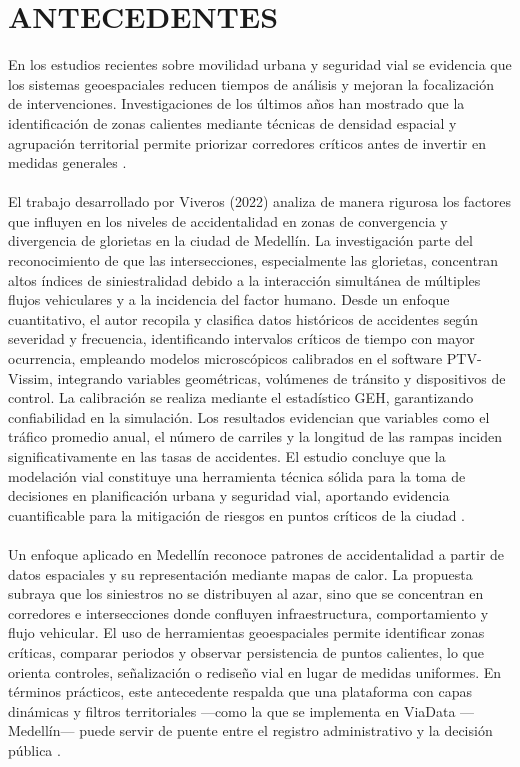 \section{ANTECEDENTES}
En los estudios recientes sobre movilidad urbana y seguridad vial se evidencia que los sistemas geoespaciales reducen tiempos de análisis y mejoran la focalización de intervenciones. Investigaciones de los últimos años han mostrado que la identificación de zonas calientes mediante técnicas de densidad espacial y agrupación territorial permite priorizar corredores críticos antes de invertir en medidas generales \cite{xu2022,li2023}.\\\\
El trabajo desarrollado por Viveros (2022) analiza de manera rigurosa los factores que influyen en los niveles de accidentalidad en zonas de convergencia y divergencia de glorietas en la ciudad de Medellín. La investigación parte del reconocimiento de que las intersecciones, especialmente las glorietas, concentran altos índices de siniestralidad debido a la interacción simultánea de múltiples flujos vehiculares y a la incidencia del factor humano. Desde un enfoque cuantitativo, el autor recopila y clasifica datos históricos de accidentes según severidad y frecuencia, identificando intervalos críticos de tiempo con mayor ocurrencia, empleando modelos microscópicos calibrados en el software PTV-Vissim, integrando variables geométricas, volúmenes de tránsito y dispositivos de control. La calibración se realiza mediante el estadístico GEH, garantizando confiabilidad en la simulación. Los resultados evidencian que variables como el tráfico promedio anual, el número de carriles y la longitud de las rampas inciden significativamente en las tasas de accidentes. El estudio concluye que la modelación vial constituye una herramienta técnica sólida para la toma de decisiones en planificación urbana y seguridad vial, aportando evidencia cuantificable para la mitigación de riesgos en puntos críticos de la ciudad \cite{viveros2022}.\\\\
Un enfoque aplicado en Medellín reconoce patrones de accidentalidad a partir de datos espaciales y su representación mediante mapas de calor. La propuesta subraya que los siniestros no se distribuyen al azar, sino que se concentran en corredores e intersecciones donde confluyen infraestructura, comportamiento y flujo vehicular. El uso de herramientas geoespaciales permite identificar zonas críticas, comparar periodos y observar persistencia de puntos calientes, lo que orienta controles, señalización o rediseño vial en lugar de medidas uniformes. En términos prácticos, este antecedente respalda que una plataforma con capas dinámicas y filtros territoriales ---como la que se implementa en ViaData — Medellín--- puede servir de puente entre el registro administrativo y la decisión pública \cite{monar2025}.\\\\
